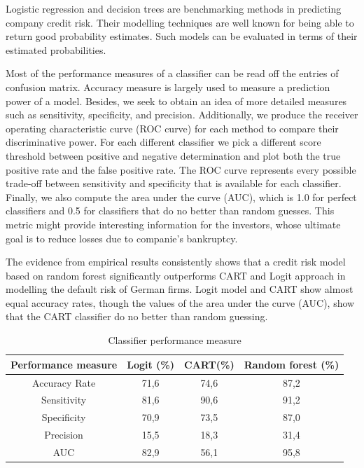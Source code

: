 \documentclass{article}
\begin{document}
Logistic regression and decision trees are benchmarking methods in predicting company credit risk. Their modelling techniques are well known for being able to return good probability estimates. Such models can be evaluated in terms of their estimated probabilities. 

Most of the performance measures of a classifier can be read off the entries of confusion matrix. Accuracy measure is largely used to measure a prediction power of a model. Besides, we seek to obtain an idea of more detailed measures such as sensitivity, specificity, and precision. Additionally, we produce the receiver operating characteristic curve (ROC curve) for each method to compare their discriminative power. For each different classifier we pick a different score threshold between positive and negative determination and plot both the true positive rate and the false positive rate. The ROC curve represents every possible trade-off between sensitivity and specificity that is available for each classifier. Finally, we also compute the area under the curve (AUC), which is 1.0 for perfect classifiers and 0.5 for classifiers that do no better than random guesses. This metric might provide interesting information for the investors, whose ultimate goal is to reduce losses due to companie's bankruptcy. 

The evidence from empirical results consistently shows that a credit risk model based on random forest significantly outperforms CART and Logit approach in modelling 
the default risk of German firms. Logit model and CART show almost equal accuracy rates, though the values of the area under the curve (AUC), show that the CART 
classifier do no better than random guessing.

\begin{center}
\begin{table}[b]
\caption{Classifier performance measure}
\begin{tabular}{cccc}
\hline\hline
Performance measure  &                Logit (\%)   &                  CART(\%)   &     Random forest (\%) \\
\hline
Accuracy Rate        &                 71,6        &                 74,6        &       87,2             \\
Sensitivity          &                 81,6        &                 90,6        &       91,2             \\
Specificity          &                 70,9        &                 73,5        &       87,0             \\
Precision            &                 15,5        &                 18,3        &       31,4             \\
AUC                  &                 82,9        &                 56,1        &       95,8             \\
\hline\hline
\end{tabular}
\end{table}
\end{center}
\end{document}

